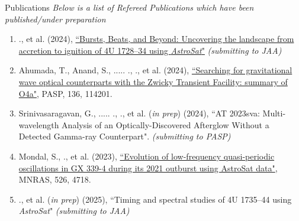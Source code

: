 \begin{rSection}{Publications} 
\hspace{-1em} {\textit{Below is a list of Refereed Publications which have been published/under preparation}}
\vspace{-0.5em}
\begin{enumerate}[itemsep=-0.5em, leftmargin=0.5em] %
    \item \me., et al. (2024), {\href{http://arxiv.org/abs/2412.06644}{``Bursts, Beats, and Beyond: Uncovering the landscape from accretion to ignition of 4U 1728--34 using \textit{AstroSat}"}} \textit{(submitting to JAA)}
    \item Ahumada, T., Anand, S., ..... ., \me ., et al. (2024), {\href{https://iopscience.iop.org/article/10.1088/1538-3873/ad8265}{``Searching for gravitational wave optical counterparts with the Zwicky Transient Facility: summary of O4a"}}, PASP, 136, 114201.
    \item Srinivasaragavan, G., ..... ., \me., et al. (\textit{in prep}) (2024), {``AT 2023sva: Multi-wavelength Analysis of an Optically-Discovered Afterglow Without a Detected Gamma-ray Counterpart"}. \textit{(submitting to PASP)}
    \item Mondal, S., \me., et al. (2023), {\href{https://ui.adsabs.harvard.edu/link_gateway/2023MNRAS.526.4718M/doi:10.1093/mnras/stad3079}{``Evolution of low-frequency quasi-periodic oscillations in GX 339-4 during its 2021 outburst using AstroSat data"}}, MNRAS, 526, 4718. 
    \item \me., et al. (\textit{in prep}) (2025), {``Timing and spectral studies of 4U 1735--44 using \textit{AstroSat}"} \textit{(submitting to JAA)}
\end{enumerate}


\end{rSection}

